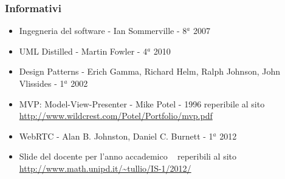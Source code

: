 {{	\subsubsection{Informativi}{
	    \begin{itemize}
		\item Ingegneria del software - Ian Sommerville - 8$^a$ 2007
		\item UML Distilled - Martin Fowler - 4$^a$ 2010
		\item Design Patterns - Erich Gamma, Richard Helm, Ralph Johnson, John Vlissides - 1$^a$ 2002 
		\item MVP: Model-View-Presenter - Mike Potel - 1996 reperibile al sito \url{http://www.wildcrest.com/Potel/Portfolio/mvp.pdf}
		\item WebRTC - Alan B. Johnston, Daniel C. Burnett - 1$^a$ 2012
		\item Slide del docente per l'anno accademico \uniAA~ reperibili al sito \url{http://www.math.unipd.it/~tullio/IS-1/2012/}
		
	    \end{itemize}
	}
    }
}
